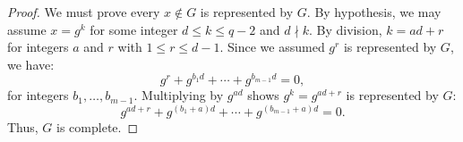 \documentclass[10pt,a4paper]{amsart}
\begin{document}
\begin{proof}
  We must prove every $x\notin G$ is represented by $G$. By
  hypothesis, we may assume $x=g^k$ for some integer $d\le k\le q-2$
  and $d\nmid k$. By division, $k=ad+r$ for integers $a$ and $r$ with
  $1\le r\le d-1$. Since we assumed $g^r$ is represented by $G$, we
  have:
  $$
  g^{r} + g^{b_1d}+\dotsb+g^{b_{m-1}d}=0,
  $$
  for integers $b_1,\dots,b_{m-1}$. Multiplying by $g^{ad}$ shows
  $g^k=g^{ad+r}$ is represented by $G$:
  $$
  g^{ad+r} + g^{(b_1+a)d}+\dotsb+g^{(b_{m-1}+a)d}=0.
  $$
  Thus,   $G$ is complete. 
\end{proof}
\end{document}
